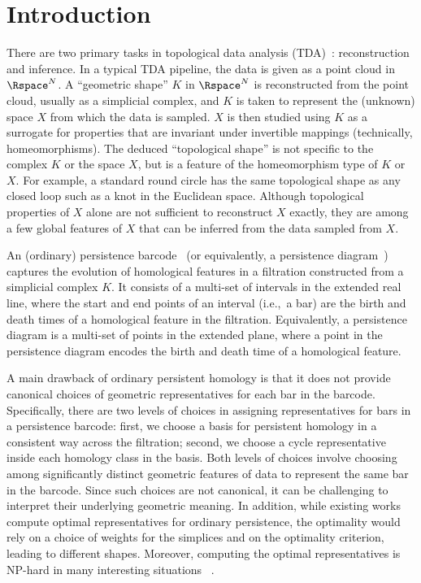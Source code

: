\section{Introduction}
\label{sec:introduction}

There are two primary tasks in topological data analysis (TDA)~\cite{DeyWang2022,EdelsbrunnerHarer2010,Zomorodian2005}: reconstruction and inference. 
In a typical TDA pipeline, the data is given as a point cloud in $\Rspace^N$.  
A ``geometric shape'' $K$ in $\Rspace^N$ is reconstructed from the point cloud, usually as a simplicial complex, and $K$ is taken to represent the (unknown) space $X$ from which the data is sampled. 
$X$ is then studied using $K$ as a surrogate for properties that are invariant under invertible mappings (technically, homeomorphisms). 
The deduced ``topological shape'' is not specific to the complex $K$ or the space $X$, but is a feature of the homeomorphism type of $K$ or $X$. 
For example, a standard round circle has the same topological shape as any closed loop such as a knot in the Euclidean space. 
Although topological properties of $X$ alone are not sufficient to reconstruct $X$ exactly, they are among a few global features of $X$ that can be inferred from the data sampled from $X$. 

An (ordinary) persistence barcode~\cite{CarlssonZomorodianCollins2004,Ghrist2008} (or equivalently, a persistence diagram~\cite{ChazalCohenSteinerGlisse2009, Cohen-SteinerEdelsbrunnerHarer2005, EdelsbrunnerLetscherZomorodian2002}) captures the evolution of homological features in a filtration constructed from a simplicial complex $K$. 
It consists of a multi-set of intervals in the extended real line, where the start and end points of an interval (i.e.,~a bar) are the birth and death times of a homological feature in the filtration. 
Equivalently, a persistence diagram is a multi-set of points in the extended plane, where a point in the persistence diagram encodes the birth and death time of a homological feature. 

A main drawback of ordinary persistent homology is that it does not provide canonical choices of geometric representatives for each bar in the barcode. 
Specifically, there are two levels of choices in assigning representatives for bars in a persistence barcode: first, we choose a basis for persistent homology in a consistent way across the filtration; second, we choose a cycle representative inside each homology class in the basis. Both levels of choices involve choosing among significantly distinct geometric features of data to represent the same bar in the barcode. Since such choices are not canonical, it can be challenging to interpret their underlying geometric meaning. In addition, while existing works~\cite{Oleksiy2010,DeyHouMandal2020, Obayashi2018} compute optimal representatives for ordinary persistence, the optimality would rely on a choice of weights for the simplices and on the optimality criterion, leading to different shapes. Moreover, computing the optimal representatives is NP-hard in many interesting situations  ~\cite{ChenFreedman2011, chambers2019minimum, Chambers2009, Borradaile2020, Grochow2018, DeyHouMandal2020}.


